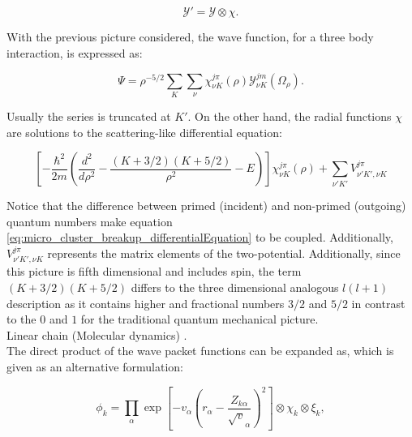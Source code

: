 \documentclass[openany]{book}
\begin{document}
\begin{equation}\label{eq:micro_cluster_breakup_hyperspherical_spinor}
	\mathcal{Y}' = \mathcal{Y} \otimes \chi.
\end{equation}

With the previous picture considered, the wave function, for a three body interaction, is expressed as: 

\begin{equation}\label{eq:micro_cluster_breakup_wavefunction_complete}
	\Psi = {\rho}^{-5/2} \sum_{K} \sum_{\nu} {\chi^{j\pi}_{\nu K} (\rho) \mathcal{Y}^{jm}_{\nu K} (\Omega_{\rho})}.
\end{equation}

Usually the series is truncated at $K'$. On the other hand, the radial functions $\chi$ are solutions to the scattering-like differential equation: 

\begin{equation}\label{eq:micro_cluster_breakup_differentialEquation}
	\left[ -\frac{\hbar^2}{2m} \left( \frac{d^2}{d\rho^2} - \frac{(K + 3/2)(K + 5/2)}{\rho^2} - E \right)  \right ] \chi^{j\pi}_{\nu K} (\rho)   + \sum_{\nu' K'} V^{j\pi}_{\nu' K', \nu K}
\end{equation}

Notice that the difference between primed (incident) and non-primed (outgoing) quantum numbers make equation \ref{eq:micro_cluster_breakup_differentialEquation} to be coupled. Additionally, $V^{j\pi}_{\nu' K', \nu K}$ represents the matrix elements of the two-potential. Additionally, since this picture is fifth dimensional and includes spin, the term $(K + 3/2)(K + 5/2)$ differs to the three dimensional analogous $l(l +1)$ description as it contains higher and fractional numbers $3/2$ and $5/2$ in contrast to the $0$ and $1$ for the traditional quantum mechanical picture. \\


Linear chain (Molecular dynamics) \cite{baba_taniguchi_kimura_2022}. \\

The direct product of the wave packet functions can be expanded as, which is given as an alternative formulation: 

\begin{equation}\label{eq:micro_linearChain_waveFunction}
	\phi_k = \prod_{\alpha} {\exp \left [- v_\alpha \left ( r_\alpha - \frac{Z_{k\alpha}}{\sqrt v_\alpha} \right )^2 \right]} \otimes \chi_k \otimes \xi_k,
\end{equation} 
\end{document}
